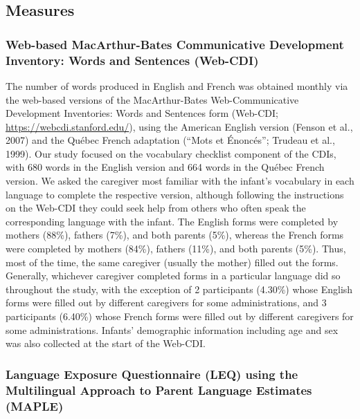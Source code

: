 \documentclass[
  english,
  ,man,floatsintext]{apa6}
\begin{document}
\hypertarget{measures}{%
\subsection{Measures}\label{measures}}

\hypertarget{web-based-macarthur-bates-communicative-development-inventory-words-and-sentences-web-cdi}{%
\subsubsection{Web-based MacArthur-Bates Communicative Development Inventory: Words and Sentences (Web-CDI)}\label{web-based-macarthur-bates-communicative-development-inventory-words-and-sentences-web-cdi}}

The number of words produced in English and French was obtained monthly via the web-based versions of the MacArthur-Bates Web-Communicative Development Inventories: Words and Sentences form (Web-CDI; \url{https://webcdi.stanford.edu/}), using the American English version (Fenson et al., 2007) and the Québec French adaptation (``Mots et Énoncés''; Trudeau et al., 1999). Our study focused on the vocabulary checklist component of the CDIs, with 680 words in the English version and 664 words in the Québec French version. We asked the caregiver most familiar with the infant's vocabulary in each language to complete the respective version, although following the instructions on the Web-CDI they could seek help from others who often speak the corresponding language with the infant. The English forms were completed by mothers (88\%), fathers (7\%), and both parents (5\%), whereas the French forms were completed by mothers (84\%), fathers (11\%), and both parents (5\%). Thus, most of the time, the same caregiver (usually the mother) filled out the forms. Generally, whichever caregiver completed forms in a particular language did so throughout the study, with the exception of 2 participants (4.30\%) whose English forms were filled out by different caregivers for some administrations, and 3 participants (6.40\%) whose French forms were filled out by different caregivers for some administrations. Infants' demographic information including age and sex was also collected at the start of the Web-CDI.

\hypertarget{language-exposure-questionnaire-leq-using-the-multilingual-approach-to-parent-language-estimates-maple}{%
\subsubsection{Language Exposure Questionnaire (LEQ) using the Multilingual Approach to Parent Language Estimates (MAPLE)}\label{language-exposure-questionnaire-leq-using-the-multilingual-approach-to-parent-language-estimates-maple}}
\end{document}
